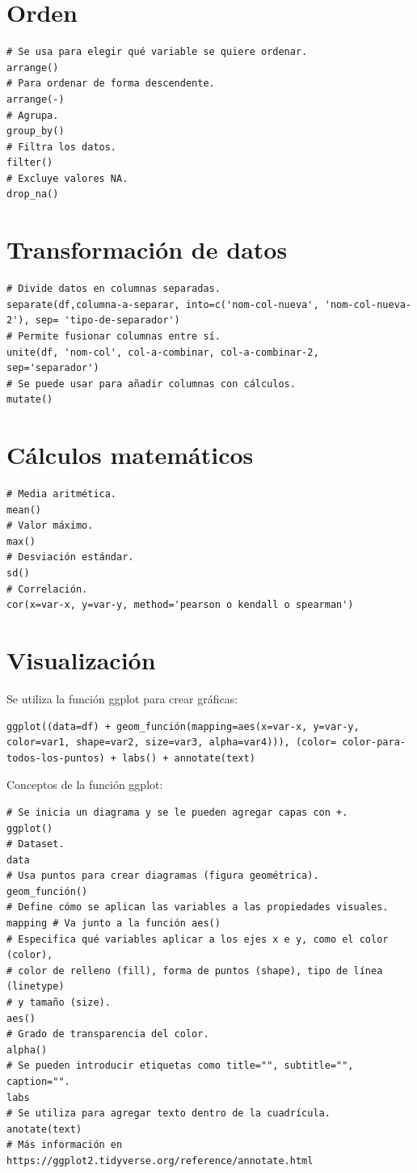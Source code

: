\documentclass[a4paper, 12pt]{book}
\begin{document}
\section{Orden}
\begin{verbatim}
# Se usa para elegir qué variable se quiere ordenar.
arrange()
# Para ordenar de forma descendente.
arrange(-)
# Agrupa.
group_by()
# Filtra los datos.
filter()
# Excluye valores NA.
drop_na()
\end{verbatim}
\section{Transformación de datos}
\begin{verbatim}
# Divide datos en columnas separadas.
separate(df,columna-a-separar, into=c('nom-col-nueva', 'nom-col-nueva-2'), sep= 'tipo-de-separador')
# Permite fusionar columnas entre sí.
unite(df, 'nom-col', col-a-combinar, col-a-combinar-2, sep='separador')
# Se puede usar para añadir columnas con cálculos.
mutate()
\end{verbatim}
\section{Cálculos matemáticos}
\begin{verbatim}
# Media aritmética.
mean()
# Valor máximo.
max()
# Desviación estándar.
sd()
# Correlación.
cor(x=var-x, y=var-y, method='pearson o kendall o spearman')
\end{verbatim}
\section{Visualización}
Se utiliza la función ggplot para crear gráficas:
\begin{verbatim}
ggplot((data=df) + geom_función(mapping=aes(x=var-x, y=var-y, color=var1, shape=var2, size=var3, alpha=var4))), (color= color-para-todos-los-puntos) + labs() + annotate(text)
\end{verbatim}


Conceptos de la función ggplot:
\begin{verbatim}
# Se inicia un diagrama y se le pueden agregar capas con +.
ggplot()
# Dataset.
data
# Usa puntos para crear diagramas (figura geométrica).
geom_función()
# Define cómo se aplican las variables a las propiedades visuales.
mapping # Va junto a la función aes()
# Especifica qué variables aplicar a los ejes x e y, como el color (color),
# color de relleno (fill), forma de puntos (shape), tipo de línea (linetype)
# y tamaño (size).
aes()
# Grado de transparencia del color.
alpha()
# Se pueden introducir etiquetas como title="", subtitle="", caption="".
labs
# Se utiliza para agregar texto dentro de la cuadrícula.
anotate(text)
# Más información en https://ggplot2.tidyverse.org/reference/annotate.html
\end{verbatim}
\end{document}
